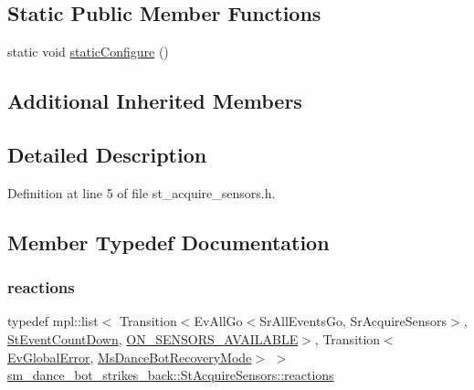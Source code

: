 \subsection*{Static Public Member Functions}
\begin{DoxyCompactItemize}
\item 
static void \hyperlink{structsm__dance__bot__strikes__back_1_1StAcquireSensors_a83de29e9c8ce05f82c487b91255f9fe1}{static\+Configure} ()
\end{DoxyCompactItemize}
\subsection*{Additional Inherited Members}


\subsection{Detailed Description}


Definition at line 5 of file st\+\_\+acquire\+\_\+sensors.\+h.



\subsection{Member Typedef Documentation}
\mbox{\label{structsm__dance__bot__strikes__back_1_1StAcquireSensors_a747e573013b729c07079c51427163cf5}} 
\subsubsection{\texorpdfstring{reactions}{reactions}}
{\footnotesize\ttfamily typedef mpl\+::list$<$ Transition$<$Ev\+All\+Go$<$Sr\+All\+Events\+Go, Sr\+Acquire\+Sensors$>$, \hyperlink{structsm__dance__bot__strikes__back_1_1StEventCountDown}{St\+Event\+Count\+Down}, \hyperlink{structsm__dance__bot__strikes__back_1_1StAcquireSensors_1_1ON__SENSORS__AVAILABLE}{O\+N\+\_\+\+S\+E\+N\+S\+O\+R\+S\+\_\+\+A\+V\+A\+I\+L\+A\+B\+LE}$>$, Transition$<$\hyperlink{structsm__dance__bot__strikes__back_1_1EvGlobalError}{Ev\+Global\+Error}, \hyperlink{classsm__dance__bot__strikes__back_1_1MsDanceBotRecoveryMode}{Ms\+Dance\+Bot\+Recovery\+Mode}$>$ $>$ \hyperlink{structsm__dance__bot__strikes__back_1_1StAcquireSensors_a747e573013b729c07079c51427163cf5}{sm\+\_\+dance\+\_\+bot\+\_\+strikes\+\_\+back\+::\+St\+Acquire\+Sensors\+::reactions}}



